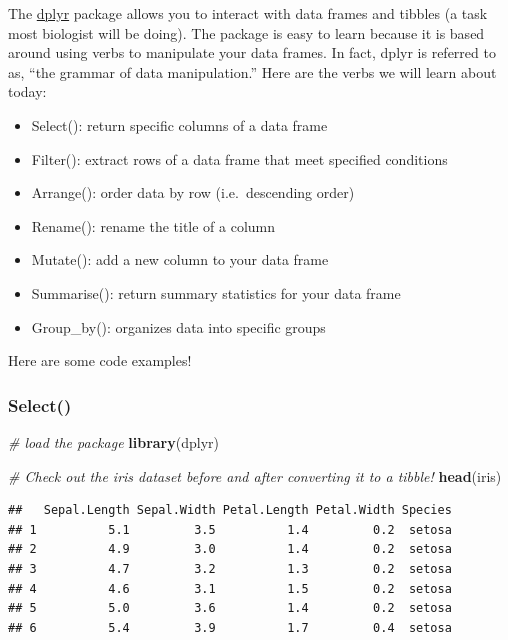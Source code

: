 \documentclass[
]{article}
\newenvironment{Shaded}{\begin{snugshade}}{\end{snugshade}}
\newcommand{\CommentTok}[1]{\textcolor[rgb]{0.56,0.35,0.01}{\textit{#1}}}
\newcommand{\KeywordTok}[1]{\textcolor[rgb]{0.13,0.29,0.53}{\textbf{#1}}}
\newcommand{\NormalTok}[1]{#1}
\providecommand{\tightlist}{%
  \setlength{\itemsep}{0pt}\setlength{\parskip}{0pt}}
\begin{document}
The \href{https://dplyr.tidyverse.org/}{dplyr} package allows you to
interact with data frames and tibbles (a task most biologist will be
doing). The package is easy to learn because it is based around using
verbs to manipulate your data frames. In fact, dplyr is referred to as,
``the grammar of data manipulation.'' Here are the verbs we will learn
about today:

\begin{itemize}
\tightlist
\item
  Select(): return specific columns of a data frame
\item
  Filter(): extract rows of a data frame that meet specified conditions
\item
  Arrange(): order data by row (i.e.~descending order)
\item
  Rename(): rename the title of a column
\item
  Mutate(): add a new column to your data frame
\item
  Summarise(): return summary statistics for your data frame
\item
  Group\_by(): organizes data into specific groups
\end{itemize}

Here are some code examples!

\hypertarget{select}{%
\subsubsection{Select()}\label{select}}

\begin{Shaded}
\begin{Highlighting}[]
\CommentTok{# load the package}
\KeywordTok{library}\NormalTok{(dplyr)}

\CommentTok{# Check out the iris dataset before and after converting it to a tibble!}
\KeywordTok{head}\NormalTok{(iris)}
\end{Highlighting}
\end{Shaded}

\begin{verbatim}
##   Sepal.Length Sepal.Width Petal.Length Petal.Width Species
## 1          5.1         3.5          1.4         0.2  setosa
## 2          4.9         3.0          1.4         0.2  setosa
## 3          4.7         3.2          1.3         0.2  setosa
## 4          4.6         3.1          1.5         0.2  setosa
## 5          5.0         3.6          1.4         0.2  setosa
## 6          5.4         3.9          1.7         0.4  setosa
\end{verbatim}
\end{document}
